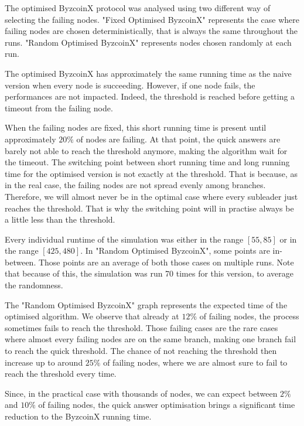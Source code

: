 \documentclass[11pt, a4paper, twoside, openright]{article}
\begin{document}
The optimised ByzcoinX protocol was analysed using two different way of selecting the failing nodes. "Fixed Optimised ByzcoinX" represents the case where failing nodes are chosen deterministically, that is always the same throughout the runs. "Random Optimised ByzcoinX" represents nodes chosen randomly at each run.

The optimised ByzcoinX has approximately the same running time as the naive version when every node is succeeding. However, if one node fails, the performances are not impacted. Indeed, the threshold is reached before getting a timeout from the failing node.

When the failing nodes are fixed, this short running time is present until approximately $20\%$ of nodes are failing. At that point, the quick answers are barely not able to reach the threshold anymore, making the algorithm wait for the timeout. The switching point between short running time and long running time for the optimised version is not exactly at the threshold. That is because, as in the real case, the failing nodes are not spread evenly among branches. Therefore, we will almost never be in the optimal case where every subleader just reaches the threshold. That is why the switching point will in practise always be a little less than the threshold.

Every individual runtime of the simulation was either in the range $[55,85]$ or in the range $[425,480]$. In "Random Optimised ByzcoinX", some points are in-between. Those points are an average of both those cases on multiple runs. Note that because of this, the simulation was run 70 times for this version, to average the randomness.

The "Random Optimised ByzcoinX" graph represents the expected time of the optimised algorithm. We observe that already at $12\%$ of failing nodes, the process sometimes fails to reach the threshold. Those failing cases are the rare cases where almost every failing nodes are on the same branch, making one branch fail to reach the quick threshold. The chance of not reaching the threshold then increase up to around $25\%$ of failing nodes, where we are almost sure to fail to reach the threshold every time.

Since, in the practical case with thousands of nodes, we can expect between $2\%$ and $10\%$ of failing nodes, the quick answer optimisation brings a significant time reduction to the ByzcoinX running time.
\end{document}
